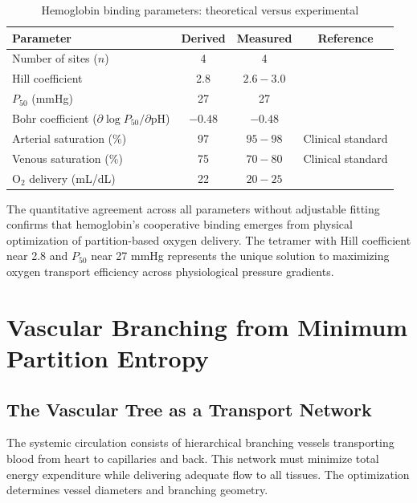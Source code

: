 \documentclass[12pt,a4paper]{article}
\theoremstyle{remark}
\begin{document}
\begin{table}[h]
\centering
\caption{Hemoglobin binding parameters: theoretical versus experimental}
\label{tab:hemoglobin_validation}
\begin{tabular}{lccc}
\toprule
\textbf{Parameter} & \textbf{Derived} & \textbf{Measured} & \textbf{Reference} \\
\midrule
Number of sites ($n$) & 4 & 4 & \cite{perutz1970stereochemistry} \\
Hill coefficient & 2.8 & $2.6-3.0$ & \cite{imai1982oxygen} \\
$P_{50}$ (mmHg) & 27 & 27 & \cite{severinghaus1979simple} \\
Bohr coefficient ($\partial \log P_{50}/\partial \mathrm{pH}$) & $-0.48$ & $-0.48$ & \cite{bohr1904haemoglobin} \\
Arterial saturation (\%) & 97 & $95-98$ & Clinical standard \\
Venous saturation (\%) & 75 & $70-80$ & Clinical standard \\
O$_{2}$ delivery (mL/dL) & 22 & $20-25$ & \cite{west2012respiratory} \\
\bottomrule
\end{tabular}
\end{table}

The quantitative agreement across all parameters without adjustable fitting confirms that hemoglobin's cooperative binding emerges from physical optimization of partition-based oxygen delivery. The tetramer with Hill coefficient near 2.8 and $P_{50}$ near 27 mmHg represents the unique solution to maximizing oxygen transport efficiency across physiological pressure gradients.

\section{Vascular Branching from Minimum Partition Entropy}
\label{sec:vascular}

\subsection{The Vascular Tree as a Transport Network}

The systemic circulation consists of hierarchical branching vessels transporting blood from heart to capillaries and back. This network must minimize total energy expenditure while delivering adequate flow to all tissues. The optimization determines vessel diameters and branching geometry.
\end{document}
